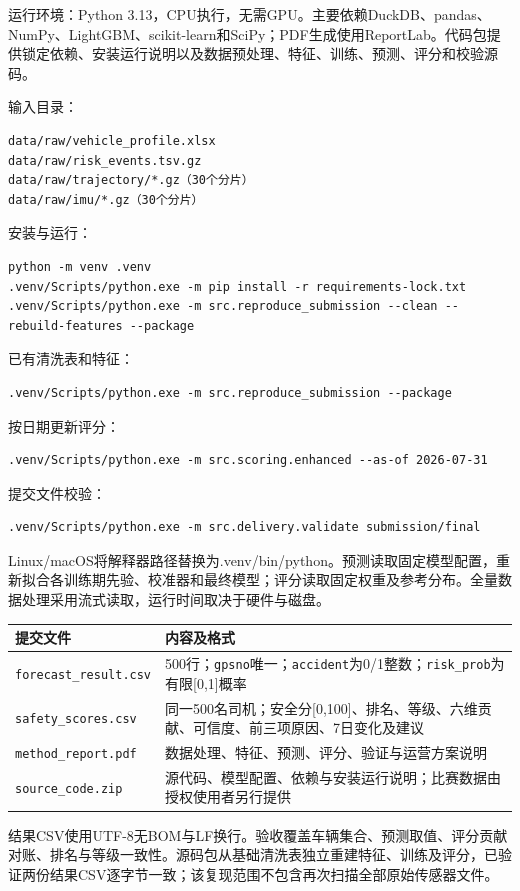 \documentclass[UTF8,10pt]{ctexart}
\newcommand{\thead}[1]{\textbf{\color{heading}#1}}
\begin{document}
运行环境：Python 3.13，CPU执行，无需GPU。主要依赖DuckDB、pandas、NumPy、LightGBM、scikit-learn和SciPy；PDF生成使用ReportLab。代码包提供锁定依赖、安装运行说明以及数据预处理、特征、训练、预测、评分和校验源码。

{\small 输入目录：}
\begin{verbatim}
data/raw/vehicle_profile.xlsx
data/raw/risk_events.tsv.gz
data/raw/trajectory/*.gz（30个分片）
data/raw/imu/*.gz（30个分片）
\end{verbatim}

{\small 安装与运行：}
\begin{verbatim}
python -m venv .venv
.venv/Scripts/python.exe -m pip install -r requirements-lock.txt
.venv/Scripts/python.exe -m src.reproduce_submission --clean --rebuild-features --package
\end{verbatim}

{\small 已有清洗表和特征：}
\begin{verbatim}
.venv/Scripts/python.exe -m src.reproduce_submission --package
\end{verbatim}

{\small 按日期更新评分：}
\begin{verbatim}
.venv/Scripts/python.exe -m src.scoring.enhanced --as-of 2026-07-31
\end{verbatim}

{\small 提交文件校验：}
\begin{verbatim}
.venv/Scripts/python.exe -m src.delivery.validate submission/final
\end{verbatim}

Linux/macOS将解释器路径替换为.venv/bin/python。预测读取固定模型配置，重新拟合各训练期先验、校准器和最终模型；评分读取固定权重及参考分布。全量数据处理采用流式读取，运行时间取决于硬件与磁盘。

\begin{center}\small
{}
\begin{tabularx}{\textwidth}{p{3.8cm} Y}
\thead{提交文件} & \thead{内容及格式} \\
\hline
\texttt{forecast\_result.csv} & 500行；\texttt{gpsno}唯一；\texttt{accident}为0/1整数；\texttt{risk\_prob}为有限[0,1]概率 \\
\hline
\texttt{safety\_scores.csv} & 同一500名司机；安全分[0,100]、排名、等级、六维贡献、可信度、前三项原因、7日变化及建议 \\
\hline
\texttt{method\_report.pdf} & 数据处理、特征、预测、评分、验证与运营方案说明 \\
\hline
\texttt{source\_code.zip} & 源代码、模型配置、依赖与安装运行说明；比赛数据由授权使用者另行提供 \\
\hline
\end{tabularx}
\end{center}

结果CSV使用UTF-8无BOM与LF换行。验收覆盖车辆集合、预测取值、评分贡献对账、排名与等级一致性。源码包从基础清洗表独立重建特征、训练及评分，已验证两份结果CSV逐字节一致；该复现范围不包含再次扫描全部原始传感器文件。
\end{document}
